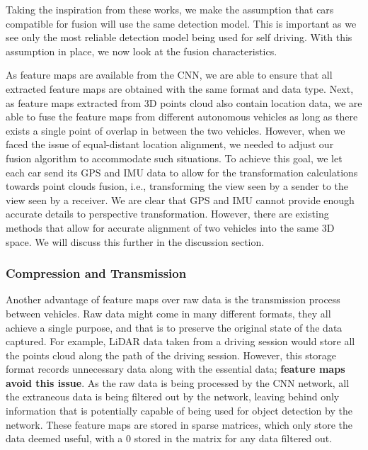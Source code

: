 \documentclass[sigconf]{acmart}
\begin{document}
Taking the inspiration from these works, we make the assumption that cars compatible for fusion will use the same detection model.
This is important as we see only the most reliable detection model being used for self driving. With this assumption in place, we now look at the fusion characteristics.








As feature maps are available from the CNN, we are able to ensure that all extracted feature maps are obtained with the same format and data type. Next, as feature maps extracted from 3D points cloud also contain location data, we are able to fuse the feature maps from different autonomous vehicles as long as there exists a single point of overlap in between the two vehicles. 
However, when we faced the issue of equal-distant location alignment, we needed to adjust our fusion algorithm to accommodate such situations. 
To achieve this goal, we let each car send its GPS and IMU data to allow for the transformation calculations towards point clouds fusion, i.e., transforming the view seen by a sender to the view seen by a receiver.
We are clear that GPS and IMU cannot provide enough accurate details to perspective transformation. However, there are existing methods that allow for accurate alignment of two vehicles into the same 3D space. We will discuss this further in the discussion section.






\subsubsection{\textbf{Compression and Transmission}}

Another advantage of feature maps over raw data is the transmission process between vehicles. 
Raw data might come in many different formats, they all achieve a single purpose, and that is to preserve the original state of the data captured. For example, LiDAR data taken from a driving session would store all the points cloud along the path of the driving session. However, this storage format records unnecessary data along with the essential data; \textbf{feature maps avoid this issue}. As the raw data is being processed by the CNN network, all the extraneous data is being filtered out by the network, leaving behind only information that is potentially capable of being used for object detection by the network. These feature maps are stored in sparse matrices, which only store the data deemed useful, with a 0 stored in the matrix for any data filtered out. 
\end{document}
